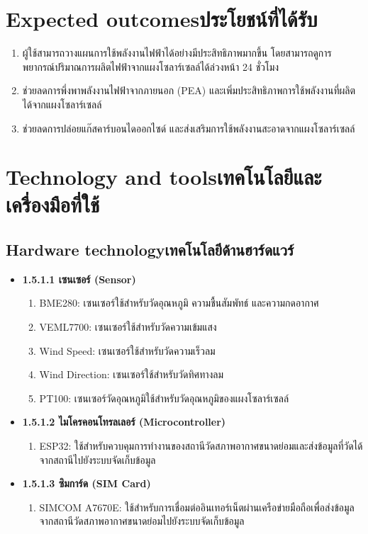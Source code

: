 \section{\ifenglish Expected outcomes\else ประโยชน์ที่ได้รับ\fi}
\begin{enumerate}
    \item ผู้ใช้สามารถวางแผนการใช้พลังงานไฟฟ้าได้อย่างมีประสิทธิภาพมากขึ้น โดยสามารถดูการพยากรณ์ปริมาณการผลิตไฟฟ้าจากแผงโซลาร์เซลล์ได้ล่วงหน้า 24 ชั่วโมง
    \item  ช่วยลดการพึ่งพาพลังงานไฟฟ้าจากภายนอก (PEA) และเพิ่มประสิทธิภาพการใช้พลังงานที่ผลิตได้จากแผงโซลาร์เซลล์
    \item  ช่วยลดการปล่อยแก๊สคาร์บอนไดออกไซด์ และส่งเสริมการใช้พลังงานสะอาดจากแผงโซลาร์เซลล์
\end{enumerate}
    



\section{\ifenglish Technology and tools\else เทคโนโลยีและเครื่องมือที่ใช้\fi}

\subsection{\ifenglish Hardware technology\else เทคโนโลยีด้านฮาร์ดแวร์\fi}
\begin{itemize}
    \item[] \textbf{1.5.1.1 เซนเซอร์ (Sensor) }
    \begin{enumerate}
    \item BME280: เซนเซอร์ใช้สำหรับวัดอุณหภูมิ ความชื้นสัมพัทธ์ และความกดอากาศ 
    \item VEML7700: เซนเซอร์ใช้สำหรับวัดความเข้มแสง 
    \item Wind Speed: เซนเซอร์ใช้สำหรับวัดความเร็วลม 
    \item Wind Direction: เซนเซอร์ใช้สำหรับวัดทิศทางลม 
    \item PT100: เซนเซอร์วัดอุณหภูมิใช้สำหรับวัดอุณหภูมิของแผงโซลาร์เซลล์ 
    \end{enumerate}

    \item[]  \textbf{1.5.1.2 ไมโครคอนโทรลเลอร์ (Microcontroller) }
    \begin{enumerate}
        \item ESP32: ใช้สำหรับควบคุมการทำงานของสถานีวัดสภาพอากาศขนาดย่อมและส่งข้อมูลที่วัดได้จากสถานีไปยังระบบจัดเก็บข้อมูล
    \end{enumerate} 

    \item[] \textbf{1.5.1.3 ซิมการ์ด (SIM Card)  }
    \begin{enumerate}
        \item SIMCOM A7670E: ใช้สำหรับการเชื่อมต่ออินเทอร์เน็ตผ่านเครือข่ายมือถือเพื่อส่งข้อมูลจากสถานีวัดสภาพอากาศขนาดย่อมไปยังระบบจัดเก็บข้อมูล
    \end{enumerate}


\end{itemize}


